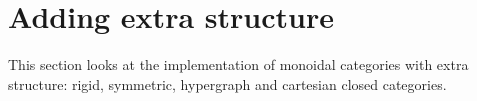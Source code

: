 
\section{Adding extra structure} \label{section:extra structure}

This section looks at the implementation of monoidal categories with extra structure: rigid, symmetric, hypergraph and cartesian closed categories.
